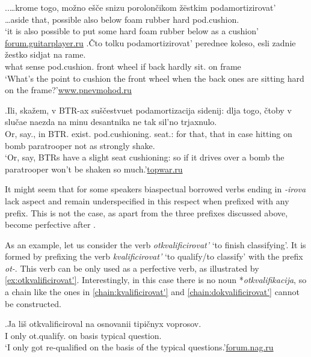 \ex.\label{ex:cushion}\ag.\label{ex:cushion1}…krome togo, mo\v{z}no e\v{s}\v{c}e snizu porolon\v{c}ikom \v{z}\"{e}stkim podamortizirovat'\textsuperscript{\PF}\\		
…aside that, possible also below {foam rubber} hard pod.cushion.\\
\trans `it is also possible to put some hard foam rubber below as a cushion'\\\hbox{}\hfill\hbox{\url{forum.guitarplayer.ru}}
\bg.\label{ex:cushion2}\v{C}to tolku podamortizirovat'\textsuperscript{\IPF} perednee koleso, esli zadnie \v{z}estko sidjat na rame.\\
what sense pod.cushion. front wheel if back hardly sit. on frame\\
\trans `What's the point to cushion the front wheel when the back ones are sitting hard on the frame?'\hbox{}\hfill\hbox{\url{www.pnevmohod.ru}}

\exg.\label{ex:podamortizacija}Ili, ska\v{z}em, v BTR-ax su\v{s}\v{c}estvuet podamortizacija sidenij: dlja togo, \v{c}toby v slu\v{c}ae naezda na minu desantnika ne tak sil'no trjaxnulo.\\
Or, say., in BTR. exist. pod.cushioning. seat.: for that, that in case hitting on bomb paratrooper not as strongly shake.\\
\trans `Or, say, BTRs have a slight seat cushioning: so if it drives over a bomb the paratrooper won't be shaken so much.'\hbox{}\hfill\hbox{\url{topwar.ru}}

It might seem that for some speakers biaspectual borrowed verbs ending in \mbox{\textit{-irova}} lack aspect and remain underspecified in this respect when prefixed with any prefix. This is not the case, as apart from the three prefixes discussed above,  become perfective after . 

As an example, let us consider the verb \textit{otkvalificirovat'} `to finish classifying'. It is formed by prefixing the verb \textit{kvalificirovat'} `to qualify/to classify' with the  prefix \textit{ot-}. This verb can be only used as a perfective verb, as illustrated by \ref{ex:otkvalificirovat'}. Interestingly, in this case there is no noun *\textit{otkvalifikacija}, so a chain like the ones in \ref{chain:kvalificirovat'} and \ref{chain:dokvalificirovat'} cannot be constructed. 

\exg.\label{ex:otkvalificirovat'}Ja li\v{s} otkvalificiroval na osnovanii tipi\v{c}nyx voprosov.\\
I only ot.qualify. on basis typical question.\\
\trans `I only got re-qualified on the basis of the typical questions.'\hbox{}\hfill\hbox{\url{forum.nag.ru}}

